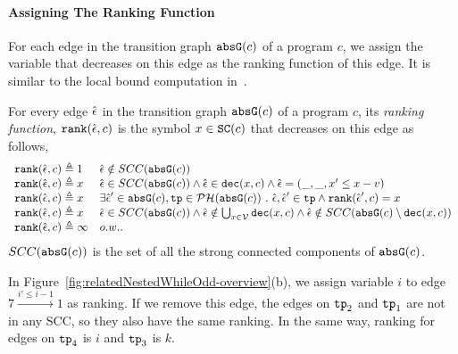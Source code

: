   \paragraph{Assigning The Ranking Function}
  For each edge in the transition graph $\mathtt{abs}{\mathtt{G}}(c)$ of a program $c$,
  we assign the variable that decreases on this edge as the ranking function of this edge.
  It is similar to the local bound computation in~\cite{SinnZV17}.
  \begin{defn}
  \label{def:ranking_gen}
  For every edge $\hat{\mathtt{\epsilon}{}}$ in the transition graph $\mathtt{abs}{\mathtt{G}}(c)$ of a program $c$,
  its \emph{ranking function}, $\mathtt{rank}(\hat{\mathtt{\epsilon}{}}, c)$
  is the symbol $x\in \mathtt{SC}(c)$ that decreases on this edge as follows,
{\small
\[ 
\begin{array}{ll}
  \mathtt{rank}(\hat{\mathtt{\epsilon}{}}, c) \triangleq 1 
  & \hat{\mathtt{\epsilon}{}} \notin SCC(\mathtt{abs}{\mathtt{G}}(c))
  \\
  \mathtt{rank}(\hat{\mathtt{\epsilon}{}}, c) \triangleq x
  & \hat{\mathtt{\epsilon}{}} \in SCC(\mathtt{abs}{\mathtt{G}}(c)) \land \hat{\mathtt{\epsilon}{}} \in \mathtt{dec}(x, c) \land  \hat{\mathtt{\epsilon}{}} = (\_, \_ , x' \leq x - v) \\
  \mathtt{rank}(\hat{\mathtt{\epsilon}{}}, c) \triangleq x
  & \exists \hat{\mathtt{\epsilon}{}}' \in \mathtt{abs}{\mathtt{G}}(c), \mathtt{tp} \in \mathcal{PH}( \mathtt{abs}{\mathtt{G}}(c)) ~.~ \hat{\mathtt{\epsilon}{}}, \hat{\mathtt{\epsilon}{}}' \in \mathtt{tp} \land \mathtt{rank}(\hat{\mathtt{\epsilon}{}}', c) = x \\
  \mathtt{rank}(\hat{\mathtt{\epsilon}{}}, c) \triangleq x
  & \hat{\mathtt{\epsilon}{}} \in SCC(\mathtt{abs}{\mathtt{G}}(c)) \land 
  \hat{\mathtt{\epsilon}{}}  \notin \bigcup_{x \in \mathcal{V}} \mathtt{dec}(x, c)
  \land \hat{\mathtt{\epsilon}{}} \notin SCC(\mathtt{abs}{\mathtt{G}}(c) \setminus \mathtt{dec}(x, c))\\
  \mathtt{rank}(\hat{\mathtt{\epsilon}{}}, c) \triangleq \infty
  & o.w..
\end{array}
\]
}
$SCC(\mathtt{abs}{\mathtt{G}}(c))$ is the set of all the strong connected components of $\mathtt{abs}{\mathtt{G}}(c)$.
  \end{defn}
  In Figure~\ref{fig:relatedNestedWhileOdd-overview}(b), we assign variable $i$ to edge $7 \xrightarrow{i' \leq i - 1} 1$ as ranking.
  If we remove this edge, the edges on $\mathtt{tp}_2$ and $\mathtt{tp}_1$ are not in any SCC, so they also have the same ranking.
In the same way, ranking for edges on $\mathtt{tp}_4$ is $i$ and $\mathtt{tp}_3$ is $k$.
